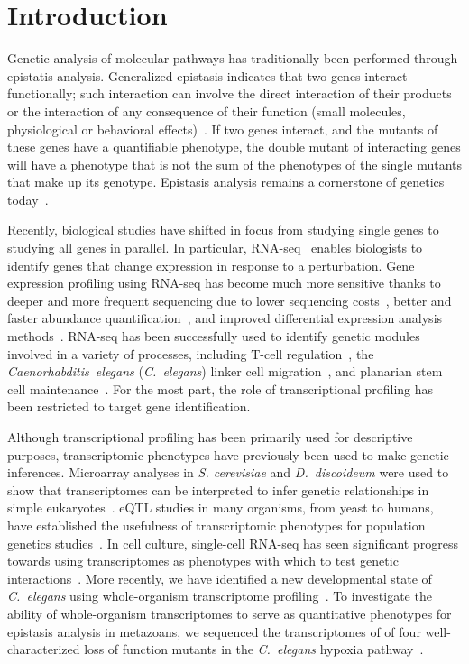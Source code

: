 \documentclass[10pt, onecolumn]{article}
\newcommand{\cel}{\emph{C.~elegans}}
\newcommand{\dicty}{\emph{D.~discoideum}}
\begin{document}

\section*{Introduction}
\label{sec:introduction}
Genetic analysis of molecular pathways has traditionally been performed
through epistatis analysis. Generalized epistasis indicates that two genes interact
functionally; such interaction can involve the direct interaction of their
products or the interaction of any consequence of their function (small molecules,
physiological or behavioral effects)~\cite{Huang2006}. If two
genes interact, and the mutants of these genes have a quantifiable phenotype,
the double mutant of interacting genes will have a phenotype that is not the sum
of the phenotypes of the single mutants that make up its genotype. Epistasis
analysis remains a cornerstone of genetics today~\cite{Phillips2008}.


Recently, biological studies have shifted in focus from studying single
genes to studying all genes in parallel. In particular,
RNA-seq~\cite{Mortazavi2008} enables biologists to
identify genes that change expression in response to a perturbation. Gene expression
profiling using RNA-seq has become much more sensitive thanks to deeper and more
frequent sequencing due to lower sequencing costs~\cite{Metzker2010},
better and faster abundance quantification~\cite{Patro2014,Bray2016,Patro2015},
and improved differential expression analysis
methods~\cite{Pimentel2016,Trapnell2013}. RNA-seq has been
successfully used to identify genetic modules involved in a variety of processes,
including T-cell regulation~\cite{Singer2016,Shalek2013}, the
\emph{Caenorhabditis~elegans} (\cel{}) linker
cell migration~\cite{Schwarz2012}, and planarian stem cell
maintenance~\cite{VanWolfswinkel2014,Scimone2014}. For the most part, the role of
transcriptional profiling has been restricted to target gene identification.

Although transcriptional profiling has been primarily used for descriptive purposes,
transcriptomic phenotypes have previously been used to make genetic inferences.
Microarray analyses in \emph{S. cerevisiae} and \dicty{} were used to show
that transcriptomes can be interpreted to infer genetic relationships in simple
eukaryotes~\cite{Hughes2000, VanDriessche2005}. eQTL studies in
many organisms, from yeast to humans, have established the usefulness of
transcriptomic phenotypes for population genetics studies~\cite{Brem2002,Schadt2003,
Li2006,King2014}. In cell culture, single-cell RNA-seq has seen significant
progress towards using transcriptomes as phenotypes with which to test genetic
interactions~\cite{Adamson2016,Dixit2016}.
More recently, we have identified a new developmental state
of \cel{} using whole-organism transcriptome profiling~\cite{Angeles-Albores2016a}.
To investigate the ability of whole-organism transcriptomes to serve as quantitative
phenotypes for epistasis analysis in metazoans, we sequenced the transcriptomes of
of four well-characterized loss of function mutants in the \cel{} hypoxia
pathway~\cite{Epstein2001,Shen2006,Shao2009,Jiang2001}.
\end{document}
